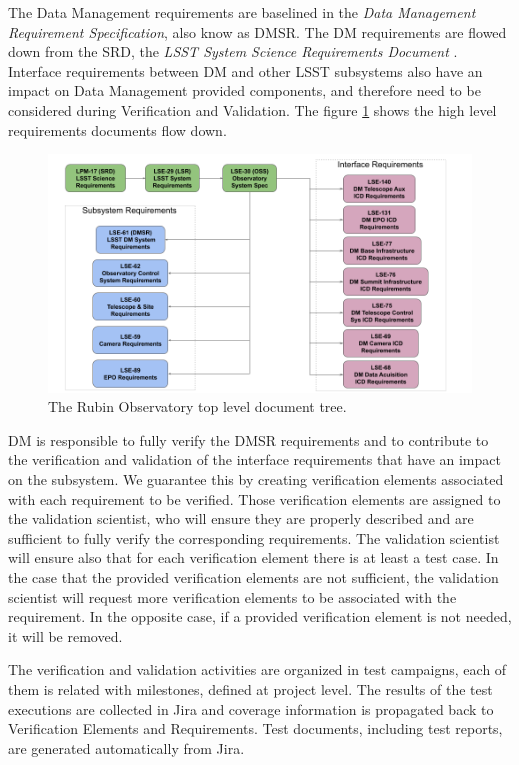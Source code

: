 The Data Management requirements are baselined in the \textit{Data Management Requirement Specification}\cite{LSE-61}, also know as DMSR.
The DM requirements are flowed down from the SRD, the \textit{LSST System Science Requirements Document} \cite{LPM-17}.
Interface requirements between DM and other LSST subsystems also have an impact on Data Management provided components,
and therefore need to be considered during Verification and Validation.
The figure \ref{fig:topdoctree} shows the high level requirements documents flow down.

\begin{figure}
\begin{center}
\includegraphics[width=\textwidth]{imgs/TopLevelDocTree.png}
 \caption{The Rubin Observatory top level document tree.}
 \label{fig:topdoctree}
\end{center}
\end{figure}

DM is responsible to fully verify the DMSR requirements and to contribute to the verification and validation of the interface requirements that have an impact on the subsystem.
We guarantee this by creating verification elements associated with each requirement to be verified.
Those verification elements are assigned to the validation scientist,
who will ensure they are properly described and are sufficient to fully verify the corresponding requirements.
The validation scientist will ensure also that for each verification element there is at least a test case.
In the case that the provided verification elements are not sufficient, the validation scientist will request more verification elements to be associated with the requirement.
In the opposite case, if a provided verification element is not needed, it will be removed.

The verification and validation activities are organized in test campaigns, each of them is related with milestones, defined at project level.
The results of the test executions are collected in Jira and coverage information is propagated back to Verification Elements and Requirements.
Test documents, including test reports, are generated automatically from Jira.

